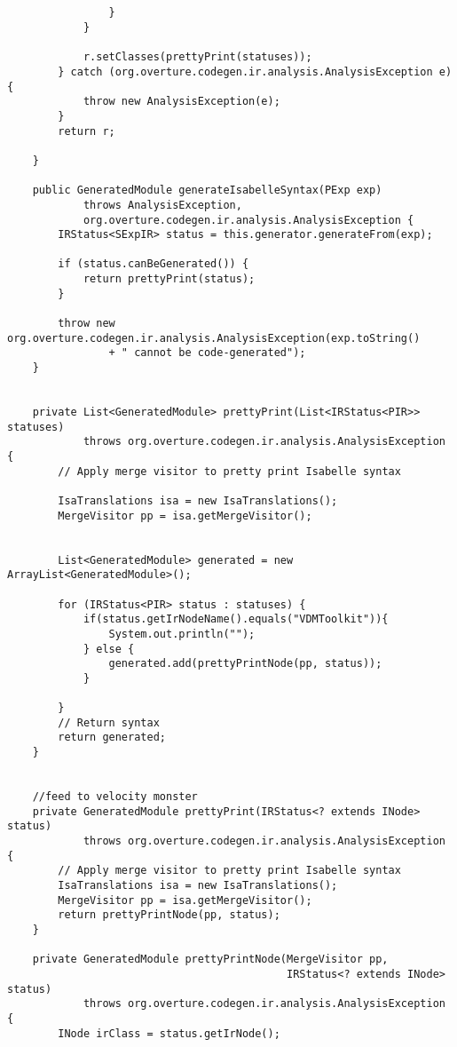 \begin{appendices}
\begin{lstlisting}
                    
                    
                }
            }

            r.setClasses(prettyPrint(statuses));
        } catch (org.overture.codegen.ir.analysis.AnalysisException e) {
            throw new AnalysisException(e);
        }
        return r;

    }

    public GeneratedModule generateIsabelleSyntax(PExp exp)
            throws AnalysisException,
            org.overture.codegen.ir.analysis.AnalysisException {
        IRStatus<SExpIR> status = this.generator.generateFrom(exp);

        if (status.canBeGenerated()) {
            return prettyPrint(status);
        }

        throw new org.overture.codegen.ir.analysis.AnalysisException(exp.toString()
                + " cannot be code-generated");
    }


    private List<GeneratedModule> prettyPrint(List<IRStatus<PIR>> statuses)
            throws org.overture.codegen.ir.analysis.AnalysisException {
        // Apply merge visitor to pretty print Isabelle syntax
      
        IsaTranslations isa = new IsaTranslations();
        MergeVisitor pp = isa.getMergeVisitor();
        
       
        List<GeneratedModule> generated = new ArrayList<GeneratedModule>();

        for (IRStatus<PIR> status : statuses) {
            if(status.getIrNodeName().equals("VDMToolkit")){
                System.out.println("");
            } else {
                generated.add(prettyPrintNode(pp, status));
            }

        }
        // Return syntax
        return generated;
    }

    
    //feed to velocity monster
    private GeneratedModule prettyPrint(IRStatus<? extends INode> status)
            throws org.overture.codegen.ir.analysis.AnalysisException {
        // Apply merge visitor to pretty print Isabelle syntax
        IsaTranslations isa = new IsaTranslations();
        MergeVisitor pp = isa.getMergeVisitor();
        return prettyPrintNode(pp, status);
    }

    private GeneratedModule prettyPrintNode(MergeVisitor pp,
                                            IRStatus<? extends INode> status)
            throws org.overture.codegen.ir.analysis.AnalysisException {
        INode irClass = status.getIrNode();


\end{lstlisting}
\end{appendices}
